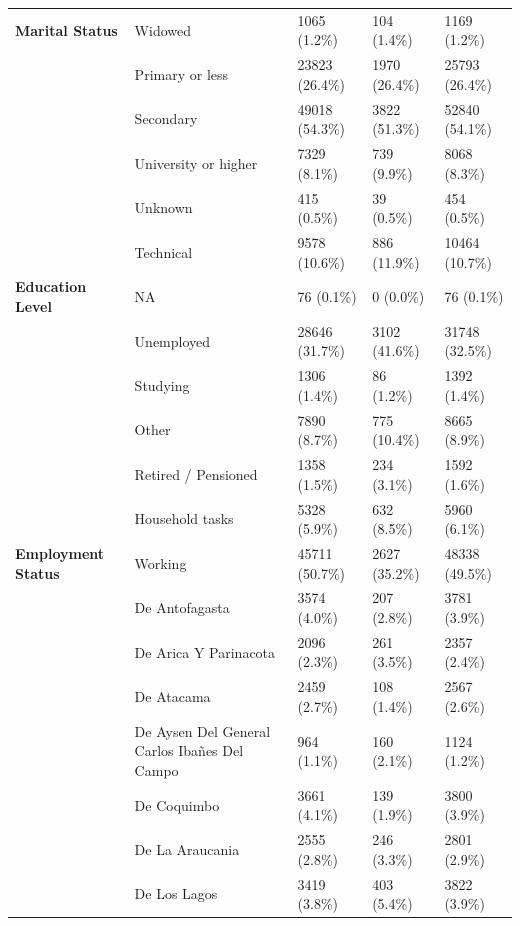 \documentclass[
  spanish,
  10pt,
]{article}
\begin{document}
\begin{table}[H]
{\begin{tabular}[t]{>{}lllll}
\cmidrule{2-5}
\multirow[t]{-5}{*}{\raggedright\arraybackslash \textbf{Marital Status}} & Widowed & 1065 (1.2\%) & 104 (1.4\%) & 1169 (1.2\%)\\
\cmidrule{1-5}
 & Primary or less & 23823 (26.4\%) & 1970 (26.4\%) & 25793 (26.4\%)\\
\cmidrule{2-5}
 & Secondary & 49018 (54.3\%) & 3822 (51.3\%) & 52840 (54.1\%)\\
\cmidrule{2-5}
 & University or higher & 7329 (8.1\%) & 739 (9.9\%) & 8068 (8.3\%)\\
\cmidrule{2-5}
 & Unknown & 415 (0.5\%) & 39 (0.5\%) & 454 (0.5\%)\\
\cmidrule{2-5}
 & Technical & 9578 (10.6\%) & 886 (11.9\%) & 10464 (10.7\%)\\
\cmidrule{2-5}
\multirow[t]{-6}{*}{\raggedright\arraybackslash \textbf{Education Level}} & NA & 76 (0.1\%) & 0 (0.0\%) & 76 (0.1\%)\\
\cmidrule{1-5}
 & Unemployed & 28646 (31.7\%) & 3102 (41.6\%) & 31748 (32.5\%)\\
\cmidrule{2-5}
 & Studying & 1306 (1.4\%) & 86 (1.2\%) & 1392 (1.4\%)\\
\cmidrule{2-5}
 & Other & 7890 (8.7\%) & 775 (10.4\%) & 8665 (8.9\%)\\
\cmidrule{2-5}
 & Retired / Pensioned & 1358 (1.5\%) & 234 (3.1\%) & 1592 (1.6\%)\\
\cmidrule{2-5}
 & Household tasks & 5328 (5.9\%) & 632 (8.5\%) & 5960 (6.1\%)\\
\cmidrule{2-5}
\multirow[t]{-6}{*}{\raggedright\arraybackslash \textbf{Employment Status}} & Working & 45711 (50.7\%) & 2627 (35.2\%) & 48338 (49.5\%)\\
\cmidrule{1-5}
 & De Antofagasta & 3574 (4.0\%) & 207 (2.8\%) & 3781 (3.9\%)\\
\cmidrule{2-5}
 & De Arica Y Parinacota & 2096 (2.3\%) & 261 (3.5\%) & 2357 (2.4\%)\\
\cmidrule{2-5}
 & De Atacama & 2459 (2.7\%) & 108 (1.4\%) & 2567 (2.6\%)\\
\cmidrule{2-5}
 & De Aysen Del General Carlos Ibañes Del Campo & 964 (1.1\%) & 160 (2.1\%) & 1124 (1.2\%)\\
\cmidrule{2-5}
 & De Coquimbo & 3661 (4.1\%) & 139 (1.9\%) & 3800 (3.9\%)\\
\cmidrule{2-5}
 & De La Araucania & 2555 (2.8\%) & 246 (3.3\%) & 2801 (2.9\%)\\
\cmidrule{2-5}
 & De Los Lagos & 3419 (3.8\%) & 403 (5.4\%) & 3822 (3.9\%)\\
\cmidrule{2-5}

\end{tabular}}
\end{table}
\end{document}
